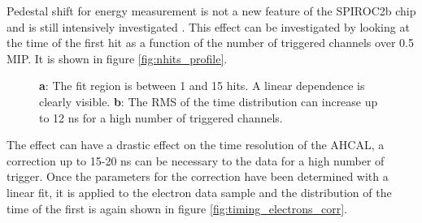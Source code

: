 \documentclass[twoside,a4paper,11pt]{article}
\begin{document}
Pedestal shift for energy measurement is not a new feature of the SPIROC2b chip and is still intensively investigated \cite{OskarMaster}.  This effect can be investigated by looking at the time of the first hit as a function of the number of triggered channels over 0.5 MIP. It is shown in figure \ref{fig:nhits_profile}.
\begin{figure}[htbp]
	\hfill
	\caption[]{\textbf{a}: The fit region is between 1 and 15 hits. A linear dependence is clearly visible. \textbf{b}: The RMS of the time distribution can increase up to 12 ns for a high number of triggered channels.}
\end{figure}
The effect can have a drastic effect on the time resolution of the AHCAL, a correction up to 15-20 ns can be necessary to the data for a high number of trigger. Once the parameters for the correction have been determined with a linear fit, it is applied to the electron data sample and the distribution of the time of the first is again shown in figure \ref{fig:timing_electrons_corr}.
\end{document}
